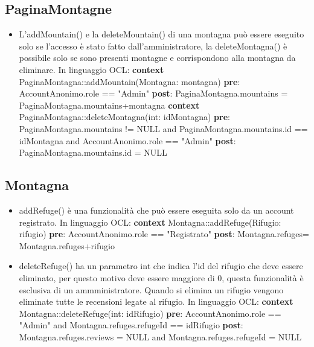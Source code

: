 \documentclass[a4paper,12pt]{article}
\begin{document}
\subsection{PaginaMontagne}
\begin{itemize}
   \item L'addMountain() e la deleteMountain() di una montagna può essere eseguito solo se l'accesso è stato fatto dall'amministratore, la deleteMontagna() è possibile solo se sono presenti montagne e corrispondono alla montagna da eliminare. \newline \newline
   In linguaggio OCL:\newline
   \textbf{context}  PaginaMontagna::addMountain(Montagna: montagna)\newline
    \textbf{pre}: AccountAnonimo.role == "Admin" \newline
    \textbf{post}: PaginaMontagna.mountains = PaginaMontagna.mountains+montagna\newline\newline
    \textbf{context}  PaginaMontagna::deleteMontagna(int: idMontagna)\newline
    \textbf{pre}: PaginaMontagna.mountains != NULL and PaginaMontagna.mountains.id == idMontagna and AccountAnonimo.role == "Admin" \newline
    \textbf{post}: PaginaMontagna.mountains.id = NULL 
\end{itemize}

\subsection{Montagna}
\begin{itemize}
    \item addRefuge() è una funzionalità che può essere eseguita solo da un account registrato. \newline\newline In linguaggio OCL:\newline
    \textbf{context} Montagna::addRefuge(Rifugio: rifugio)\newline
    \textbf{pre}: AccountAnonimo.role == "Registrato" \newline
    \textbf{post}: Montagna.refuges= Montagna.refuges+rifugio 
    \item deleteRefuge() ha un parametro int che indica l'id del rifugio che deve essere eliminato, per questo motivo deve essere maggiore di 0, questa funzionalità è esclusiva di un ammministratore. Quando si elimina un rifugio vengono eliminate tutte le recensioni legate al rifugio. \newline\newline In linguaggio OCL:\newline
    \textbf{context} Montagna::deleteRefuge(int: idRifugio)\newline
    \textbf{pre}: AccountAnonimo.role == "Admin" \newline and Montagna.refuges.refugeId == idRifugio \newline
    \textbf{post}: Montagna.refuges.reviews = NULL and Montagna.refuges.refugeId = NULL 
    
    
\end{itemize}
\end{document}
